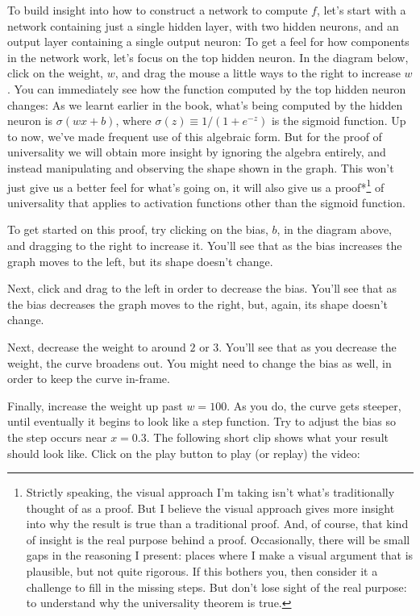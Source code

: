 To build insight into how to construct a network to compute $f$, let's start with a network containing just a single hidden layer, with two hidden neurons, and an output layer containing a single output neuron: To get a feel for how components in the network work, let's focus on the top hidden neuron. In the diagram below, click on the weight, $w$, and drag the mouse a little ways to the right to increase $w$. You can immediately see how the function computed by the top hidden neuron changes: As we learnt earlier in the book, what's being computed by the hidden neuron is $\sigma(wx + b)$, where $\sigma(z) \equiv 1/(1+e^{-z})$ is the sigmoid function. Up to now, we've made frequent use of this algebraic form. But for the proof of universality we will obtain more insight by ignoring the algebra entirely, and instead manipulating and observing the shape shown in the graph. This won't just give us a better feel for what's going on, it will also give us a proof*\footnote{Strictly speaking, the visual approach I'm taking isn't what's traditionally thought of as a proof. But I believe the visual approach gives more insight into why the result is true than a traditional proof. And, of course, that kind of insight is the real purpose behind a proof. Occasionally, there will be small gaps in the reasoning I present: places where I make a visual argument that is plausible, but not quite rigorous. If this bothers you, then consider it a challenge to fill in the missing steps. But don't lose sight of the real purpose: to understand why the universality theorem is true.} of universality that applies to activation functions other than the sigmoid function.


To get started on this proof, try clicking on the bias, $b$, in the diagram above, and dragging to the right to increase it. You'll see that as the bias increases the graph moves to the left, but its shape doesn't change.


Next, click and drag to the left in order to decrease the bias. You'll see that as the bias decreases the graph moves to the right, but, again, its shape doesn't change.


Next, decrease the weight to around $2$ or $3$. You'll see that as you decrease the weight, the curve broadens out. You might need to change the bias as well, in order to keep the curve in-frame.


Finally, increase the weight up past $w = 100$. As you do, the curve gets steeper, until eventually it begins to look like a step function. Try to adjust the bias so the step occurs near $x = 0.3$. The following short clip shows what your result should look like. Click on the play button to play (or replay) the video:


